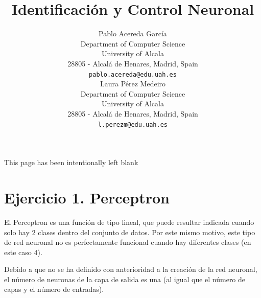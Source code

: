 \documentclass{article}
\title{Identificación y Control Neuronal}
\author{
  Pablo Acereda García\\
  Department of Computer Science\\
  University of Alcala\\
  28805 - Alcalá de Henares, Madrid, Spain \\
  \texttt{pablo.acereda@edu.uah.es} \\
   \And
  Laura Pérez Medeiro\\
  Department of Computer Science\\
  University of Alcala\\
  28805 - Alcalá de Henares, Madrid, Spain \\
  \texttt{l.perezm@edu.uah.es} \\
}
\begin{document}
\maketitle

\newpage
\vspace*{\fill}
 \begin{center}
This page has been intentionally left blank
 \end{center}
\vspace*{\fill}
\newpage

\tableofcontents

\newpage

\section{Ejercicio 1. Perceptron}

El Perceptron es una función de tipo lineal, que puede resultar indicada cuando
solo hay 2 clases dentro del conjunto de datos. Por este mismo motivo, este tipo
de red neuronal no es perfectamente funcional cuando hay diferentes clases (en
este caso 4).

Debido a que no se ha definido con anterioridad a la creación de la red
neuronal, el número de neuronas de la capa de salida es una (al igual que el
número de capas y el número de entradas).
\end{document}
